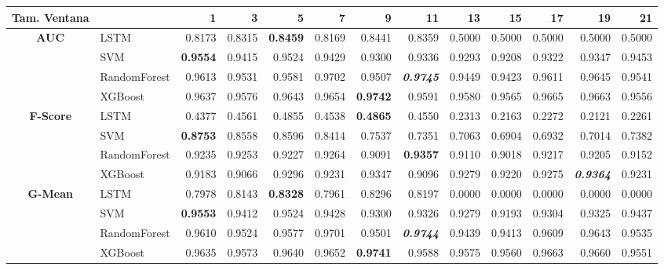 \begin{table}[H]
	\centering
	\begin{adjustbox}{max width=14cm}
		\begin{tabular}{|c|l|r|r|r|r|r|r|r|r|r|r|r|}
			\hline
			\textbf{Tam. Ventana}&         &      1  &      3  &      5  &      7  &      9  &      11 &      13 &      15 &      17 &      19 &      21 \\
			\hline
			\textbf{AUC} &  LSTM &  0.8173 &  0.8315 & \textbf{  0.8459 } &  0.8169 &  0.8441 &  0.8359 &  0.5000 &  0.5000 &  0.5000 &  0.5000 &  0.5000 \\
			&  SVM & \textbf{  0.9554 } &  0.9415 &  0.9524 &  0.9429 &  0.9300 &  0.9336 &  0.9293 &  0.9208 &  0.9322 &  0.9347 &  0.9453 \\
			&  RandomForest &  0.9613 &  0.9531 &  0.9581 &  0.9702 &  0.9507 & \textit{ \textbf{  0.9745 } } &  0.9449 &  0.9423 &  0.9611 &  0.9645 &  0.9541 \\
			&  XGBoost &  0.9637 &  0.9576 &  0.9643 &  0.9654 & \textbf{  0.9742 } &  0.9591 &  0.9580 &  0.9565 &  0.9665 &  0.9663 &  0.9556 \\
			\hline
			\textbf{F-Score} &  LSTM &  0.4377 &  0.4561 &  0.4855 &  0.4538 & \textbf{  0.4865 } &  0.4550 &  0.2313 &  0.2163 &  0.2272 &  0.2121 &  0.2261 \\
			&  SVM & \textbf{  0.8753 } &  0.8558 &  0.8596 &  0.8414 &  0.7537 &  0.7351 &  0.7063 &  0.6904 &  0.6932 &  0.7014 &  0.7382 \\
			&  RandomForest &  0.9235 &  0.9253 &  0.9227 &  0.9264 &  0.9091 & \textbf{  0.9357 } &  0.9110 &  0.9018 &  0.9217 &  0.9205 &  0.9152 \\
			&  XGBoost &  0.9183 &  0.9066 &  0.9296 &  0.9231 &  0.9347 &  0.9096 &  0.9279 &  0.9220 &  0.9275 & \textit{ \textbf{  0.9364 } } &  0.9231 \\
			\hline
			\textbf{G-Mean} &  LSTM &  0.7978 &  0.8143 & \textbf{  0.8328 } &  0.7961 &  0.8296 &  0.8197 &  0.0000 &  0.0000 &  0.0000 &  0.0000 &  0.0000 \\
			&  SVM & \textbf{  0.9553 } &  0.9412 &  0.9524 &  0.9428 &  0.9300 &  0.9326 &  0.9279 &  0.9193 &  0.9304 &  0.9325 &  0.9437 \\
			&  RandomForest &  0.9610 &  0.9524 &  0.9577 &  0.9701 &  0.9501 & \textit{ \textbf{  0.9744 } } &  0.9439 &  0.9413 &  0.9609 &  0.9643 &  0.9535 \\
			&  XGBoost &  0.9635 &  0.9573 &  0.9640 &  0.9652 & \textbf{  0.9741 } &  0.9588 &  0.9575 &  0.9560 &  0.9663 &  0.9660 &  0.9551 \\

\end{tabular}
\end{adjustbox}
\end{table}
